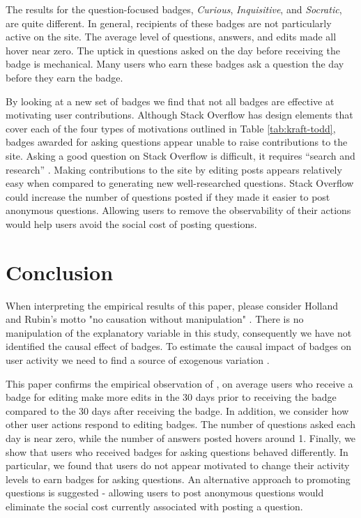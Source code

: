 \documentclass[conference]{IEEEtran}
\newcommand{\1}{\mathds{1}}
\begin{document}
The results for the question-focused badges, \textit{Curious}, \textit{Inquisitive}, and \textit{Socratic}, are quite different. In general, recipients of these badges are not particularly active on the site. The average level of questions, answers, and edits made all hover near zero. The uptick in questions asked on the day before receiving the badge is mechanical. Many users who earn these badges ask a question the day before they earn the badge.

By looking at a new set of badges we find that not all badges are effective at motivating user contributions. Although Stack Overflow has design elements that cover each of the four types of motivations outlined in Table \ref{tab:kraft-todd}, badges awarded for asking questions appear unable to raise contributions to the site. Asking a good question on Stack Overflow is difficult, it requires ``search and research'' \cite{so-ask}. Making contributions to the site by editing posts appears relatively easy when compared to generating new well-researched questions. Stack Overflow could increase the number of questions posted if they made it easier to post anonymous questions. Allowing users to remove the observability of their actions would help users avoid the social cost of posting questions.

\section{Conclusion}

When interpreting the empirical results of this paper, please consider Holland and Rubin's motto "no causation without manipulation" \citep{Holland1986}. There is no manipulation of the explanatory variable in this study, consequently we have not identified the causal effect of badges. To estimate the causal impact of badges on user activity we need to find a source of exogenous variation \citep{Miller2013}.

This paper confirms the empirical observation of \citet{Grant2013}, on average users who receive a badge for editing make more edits in the 30 days prior to receiving the badge compared to the 30 days after receiving the badge. In addition, we consider how other user actions respond to editing badges. The number of questions asked each day is near zero, while the number of answers posted hovers around 1. Finally, we show that users who received badges for asking questions behaved differently. In particular, we found that users do not appear motivated to change their activity levels to earn badges for asking questions. An alternative approach to promoting questions is suggested - allowing users to post anonymous questions would eliminate the social cost currently associated with posting a question.
\end{document}
